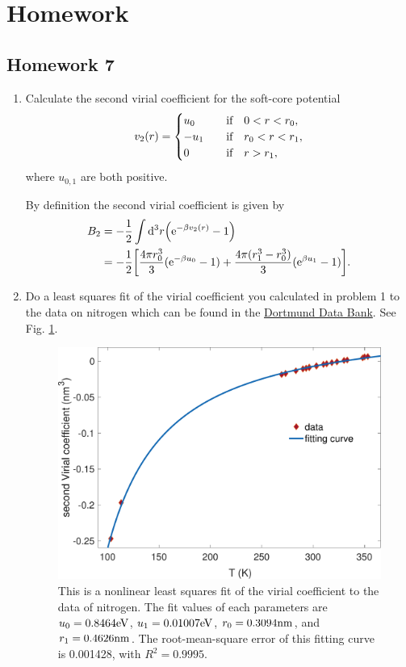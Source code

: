 \documentclass[10pt]{article}
\begin{document}
	\newpage

	\section{Homework}\label{sec: homework}

	\subsection{Homework 7}
	\begin{enumerate}
		\item Calculate the second virial coefficient for the soft-core potential
		\begin{equation}
			v_2(r) =
			\begin{cases}
				u_0 & \qif 0 < r < r_0, \\
				-u_1 & \qif r_0 < r < r_1, \\
				0 & \qif r > r_1,
			\end{cases}
		\end{equation}
		where $u_{0,1}$ are both positive.

		By definition the second virial coefficient is given by
		\begin{align}
			B_2 &= -\frac{1}{2} \int \dd^3 r \qty({\mathrm{e}}^{-\beta v_2(r)} - 1) \\
			&= -\frac{1}{2} \qty[\frac{4\pi r_0^3}{3}({\mathrm{e}}^{-\beta u_0} - 1) + \frac{4\pi (r_1^3 - r_0^3)}{3}({\mathrm{e}}^{\beta u_1} - 1)].
		\end{align}
		\item Do a least squares fit of the virial coefficient you calculated in problem 1 to the data on nitrogen which can be found in the \href{http://www.ddbst.com/en/EED/PCP/BII_C1056.php}{Dortmund Data Bank}. See Fig. \ref{fig: virial fit}.
		\begin{figure}[htbp]
			\centering
			\includegraphics[width=0.7 \textwidth]{figure/virial_fit.pdf}
			\caption{This is a nonlinear least squares fit of the virial coefficient to the data of nitrogen. The fit values of each parameters are $u_0 = 0.8464 {\mathrm{eV}}$, $u_1 = 0.01007 {\mathrm{eV}}$, $r_0 = 0.3094 {\mathrm{nm}}$, and $r_1 = 0.4626 {\mathrm{nm}}$. The root-mean-square error of this fitting curve is 0.001428, with $R^2 = 0.9995$.}
			\label{fig: virial fit}
		\end{figure}
	\end{enumerate}
\end{document}
